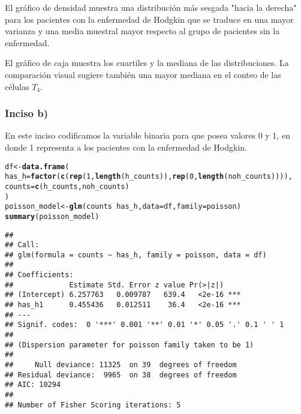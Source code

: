 \documentclass[paper=letter, fontsize=11pt]{scrartcl}\usepackage[]{graphicx}\usepackage[]{xcolor}
\makeatletter
\newcommand{\hlnum}[1]{\textcolor[rgb]{0.686,0.059,0.569}{#1}}%
\newcommand{\hlopt}[1]{\textcolor[rgb]{0,0,0}{#1}}%
\newcommand{\hldef}[1]{\textcolor[rgb]{0.345,0.345,0.345}{#1}}%
\newcommand{\hlkwb}[1]{\textcolor[rgb]{0.69,0.353,0.396}{#1}}%
\newcommand{\hlkwc}[1]{\textcolor[rgb]{0.333,0.667,0.333}{#1}}%
\newcommand{\hlkwd}[1]{\textcolor[rgb]{0.737,0.353,0.396}{\textbf{#1}}}%
\newenvironment{kframe}{%
 \def\at@end@of@kframe{}%
 \ifinner\ifhmode%
  \def\at@end@of@kframe{\end{minipage}}%
  \begin{minipage}{\columnwidth}%
 \fi\fi%
 \def\FrameCommand##1{\hskip\@totalleftmargin \hskip-\fboxsep
 \colorbox{shadecolor}{##1}\hskip-\fboxsep
     \hskip-\linewidth \hskip-\@totalleftmargin \hskip\columnwidth}%
 \MakeFramed {\advance\hsize-\width
   \@totalleftmargin\z@ \linewidth\hsize
   \@setminipage}}%
 {\par\unskip\endMakeFramed%
 \at@end@of@kframe}
\newenvironment{knitrout}{}{} %
\numberwithin{equation}{problemcounter} %
\numberwithin{figure}{problemcounter} %
\numberwithin{table}{problemcounter} %
\numberwithin{subsection}{problemcounter}
\makeatother
\begin{document}
El gráfico de densidad muestra una distribución más sesgada "hacia la derecha" para los pacientes con la enfermedad de Hodgkin que se traduce en una mayor varianza y una media muestral mayor respecto al grupo de pacientes sin la enfermedad.

El gráfico de caja muestra los cuartiles y la mediana de las distribuciones. La comparación visual sugiere también una mayor mediana en el conteo de las células $T_4$.
\subsubsection*{Inciso b)}

En este inciso codificamos la variable binaria para que posea valores 0 y 1, en donde 1 representa a los pacientes con la enfermedad de Hodgkin.

\begin{knitrout}
\color{fgcolor}\begin{kframe}
\begin{alltt}
\hldef{df} \hlkwb{<-} \hlkwd{data.frame}\hldef{(}
  \hlkwc{has_h} \hldef{=} \hlkwd{factor}\hldef{(}\hlkwd{c}\hldef{(}\hlkwd{rep}\hldef{(}\hlnum{1}\hldef{,} \hlkwd{length}\hldef{(h_counts)),} \hlkwd{rep}\hldef{(}\hlnum{0}\hldef{,} \hlkwd{length}\hldef{(noh_counts)))),}
  \hlkwc{counts} \hldef{=} \hlkwd{c}\hldef{(h_counts, noh_counts)}
\hldef{)}
\hldef{poisson_model} \hlkwb{<-} \hlkwd{glm}\hldef{(counts} \hlopt{~} \hldef{has_h,} \hlkwc{data} \hldef{= df,} \hlkwc{family} \hldef{= poisson)}
\hlkwd{summary}\hldef{(poisson_model)}
\end{alltt}
\begin{verbatim}
## 
## Call:
## glm(formula = counts ~ has_h, family = poisson, data = df)
## 
## Coefficients:
##             Estimate Std. Error z value Pr(>|z|)    
## (Intercept) 6.257763   0.009787   639.4   <2e-16 ***
## has_h1      0.455436   0.012511    36.4   <2e-16 ***
## ---
## Signif. codes:  0 '***' 0.001 '**' 0.01 '*' 0.05 '.' 0.1 ' ' 1
## 
## (Dispersion parameter for poisson family taken to be 1)
## 
##     Null deviance: 11325  on 39  degrees of freedom
## Residual deviance:  9965  on 38  degrees of freedom
## AIC: 10294
## 
## Number of Fisher Scoring iterations: 5
\end{verbatim}
\end{kframe}
\end{knitrout}
\end{document}
